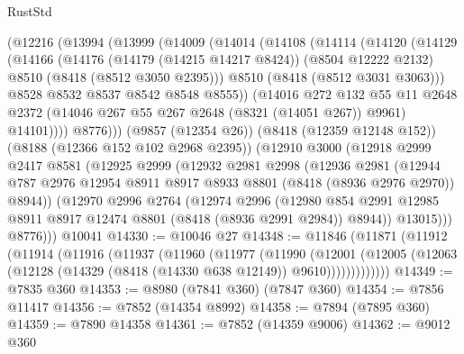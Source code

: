 \begin{lexlean}{RustStd}
\begin{coremodule}
    (@12216
      (@13994
        (@13999
          (@14009
            (@14014
              (@14108
                (@14114
                  (@14120
                    (@14129
                      (@14166
                        (@14176
                          (@14179 (@14215 @14217 @8424))
                          (@8504 @12222 @2132)
                          @8510
                          (@8418 (@8512 @3050 @2395)))
                        @8510
                        (@8418 (@8512 @3031 @3063)))
                      @8528
                      @8532
                      @8537
                      @8542
                      @8548
                      @8555))
                  (@14016
                    @272
                    @132
                    @55
                    @11
                    @2648
                    @2372
                    (@14046 @267 @55 @267 @2648 (@8321 (@14051 @267)) @9961)
                    @14101))))
            @8776)))
      (@9857 (@12354 @26))
      (@8418 (@12359 @12148 @152))
      (@8188 (@12366 @152 @102 @2968 @2395))
      (@12910
        @3000
        (@12918
          @2999
          @2417
          @8581
          (@12925
            @2999
            (@12932
              @2981
              @2998
              (@12936
                @2981
                (@12944
                  @787
                  @2976
                  @12954
                  @8911
                  @8917
                  @8933
                  @8801
                  (@8418 (@8936 @2976 @2970))
                  @8944))
              (@12970
                @2996
                @2764
                (@12974
                  @2996
                  (@12980
                    @854
                    @2991
                    @12985
                    @8911
                    @8917
                    @12474
                    @8801
                    (@8418 (@8936 @2991 @2984))
                    @8944))
                @13015)))
          @8776)))
    @10041
@14330 := @10046 @27
@14348 := @11846
    (@11871
      (@11912
        (@11914
          (@11916
            (@11937
              (@11960
                (@11977
                  (@11990
                    (@12001
                      (@12005
                        (@12063 (@12128 (@14329 (@8418 (@14330 @638 @12149)) @9610)))))))))))))
@14349 := @7835 @360
@14353 := @8980 (@7841 @360) (@7847 @360)
@14354 := @7856 @11417
@14356 := @7852 (@14354 @8992)
@14358 := @7894 (@7895 @360)
@14359 := @7890 @14358
@14361 := @7852 (@14359 @9006)
@14362 := @9012 @360

\end{coremodule}
\end{lexlean}
